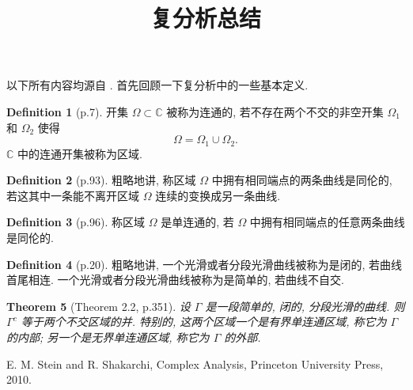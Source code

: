 \documentclass[a4paper,11pt]{article}
\title{复分析总结}
\newtheorem{theorem}{Theorem}[section]
\theoremstyle{definition}
\newtheorem{definition}[theorem]{Definition}
\begin{document}
\begin{CJK*}{UTF8}{gbsn}

\maketitle

以下所有内容均源自 \cite{ss10}. 首先回顾一下复分析中的一些基本定义.

\begin{definition}[p.7]
    开集 $ \Omega \subset \mathbb{C} $ 被称为连通的, 若不存在两个不交的非空开集 $ \Omega_1 $ 和 $ \Omega_2 $ 使得
    $$
        \Omega = \Omega_1 \cup \Omega_2.
    $$
    $ \mathbb{C} $ 中的连通开集被称为区域.
\end{definition}

\begin{definition}[p.93]
    粗略地讲, 
    称区域 $ \Omega $ 中拥有相同端点的两条曲线是同伦的, 若这其中一条能不离开区域 $ \Omega $ 连续的变换成另一条曲线.
\end{definition}

\begin{definition}[p.96]
    称区域 $ \Omega $ 是单连通的, 若 $ \Omega $ 中拥有相同端点的任意两条曲线是同伦的.
\end{definition}


\begin{definition}[p.20]
    粗略地讲, 
    一个光滑或者分段光滑曲线被称为是闭的, 若曲线首尾相连.    
    一个光滑或者分段光滑曲线被称为是简单的, 若曲线不自交.
\end{definition}

\begin{theorem}[Theorem 2.2, p.351]
    设 $ \Gamma $ 是一段简单的, 闭的, 分段光滑的曲线. 则 $ \Gamma^c $ 等于两个不交区域的并. 
    特别的, 这两个区域一个是有界单连通区域, 称它为 $ \Gamma $ 的内部;
    另一个是无界单连通区域, 称它为 $ \Gamma $ 的外部.
\end{theorem}

\begin{thebibliography}{99}

      E. M. Stein and R. Shakarchi, Complex Analysis, Princeton University Press, 2010.
    
\end{thebibliography}

\end{CJK*}
\end{document}
